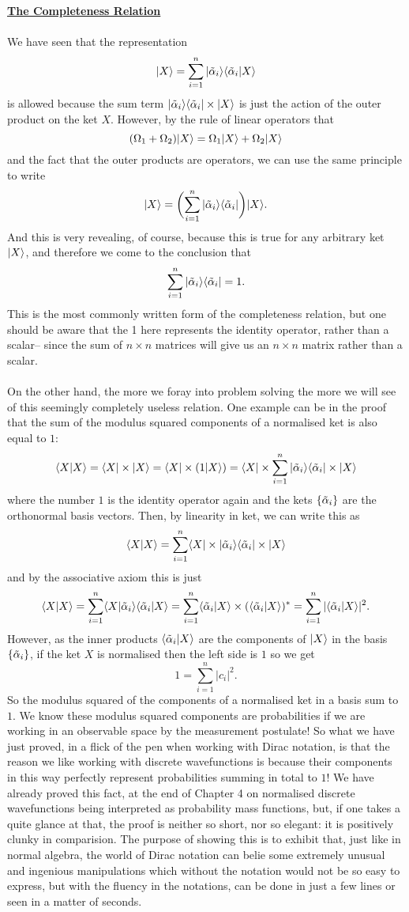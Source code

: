\\\\
\textbf{\underline{The Completeness Relation}}
\\\\
We have seen that the representation
$$
\ket{X}=\northexp{X}{\talpha_{i}}
$$
is allowed because the sum term $\sop{\talpha_{i}}\times \ket{X}$ is just the action of the outer product on the ket ${X}$. However, by the rule of linear operators that 
$$
(\Omega_{1}+\Omega_{2})\ket{X}=\Omega_{1}\ket{X}+\Omega_{2}\ket{X}
$$
and the fact that the outer products are operators, we can use the same principle to write 
$$
\ket{X}=\biggl(\sum_{i=1}^{n}\sop{\talpha_{i}}\biggr)\ket{X}.
$$
And this is very revealing, of course, because this is true for any arbitrary ket $\ket{X}$, and therefore we come to the conclusion that 
$$
\sum_{i=1}^{n}\sop{\talpha_{i}}=1.
$$
This is the most commonly written form of the completeness relation, but one should be aware that the 1 here represents the identity operator, rather than a scalar-- since the sum of $n\times n$ matrices will give us an $n\times n$ matrix rather than a scalar.
\\\\
On the other hand, the more we foray into problem solving the more we will see of this seemingly completely useless relation. One example can be in the proof that the sum of the modulus squared components of a normalised ket is also equal to $1$:
$$
\sip{X}=\bra{X}\times\ket{X}=\bra{X}\times (1\ket{X})=\bra{X}\times \sum_{i=1}^{n}\sop{\talpha_{i}}\times\ket{X}
$$
where the number $1$ is the identity operator again and the kets $\setof{\talpha_{i}}$ are the orthonormal basis vectors. Then, by linearity in ket, we can write this as 
$$
\sip{X}=\sum_{i=1}^{n}\bra{X}\times\sop{\talpha_{i}}\times\ket{X}
$$
and by the associative axiom this is just
$$
\sip{X}=\sum_{i=1}^{n}\ip{X}{\talpha_{i}}\ip{\talpha_{i}}{X}=\sum_{i=1}^{n}\ip{\talpha_{i}}{X}\times(\ip{\talpha_{i}}{X})^{\ast}=\sum_{i=1}^{n}|\ip{\talpha_{i}}{X}|^{2}.
$$
However, as the inner products $\ip{\talpha_{i}}{X}$ are the components of $\ket{X}$ in the basis $\setof{\talpha_{i}}$,  if the ket $X$ is normalised then the left side is $1$ so we get 
$$
1=\sum_{i=1}^{n}|c_{i}|^2.
$$
So the modulus squared of the components of a normalised ket in a basis sum to $1$. We know these modulus squared components are probabilities if we are working in an observable space by the measurement postulate! So what we have just proved, in a flick of the pen when working with Dirac notation, is that the reason we like working with discrete wavefunctions is because their components in this way perfectly represent probabilities summing in total to $1$! We have already proved this fact, at the end of Chapter 4 on normalised discrete wavefunctions being interpreted as probability mass functions, but, if one takes a quite glance at that, the proof is neither so short, nor so elegant: it is positively clunky in comparision. The purpose of showing this is to exhibit that, just like in normal algebra, the world of Dirac notation can belie some extremely unusual and ingenious manipulations which without the notation would not be so easy to express, but with the fluency in the notations, can be done in just a few lines or seen in a matter of seconds. 
